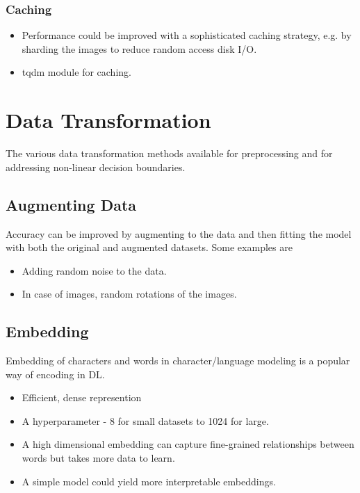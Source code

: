 \documentclass[a4paper, 12pt]{report}
\begin{document}
\subsection{Caching}
\begin{itemize}
\item Performance could be improved with a sophisticated caching strategy, e.g. by sharding the images to reduce random access disk I/O. 
\item {\color{cyan} tqdm module} for caching.
\end{itemize}

\chapter{Data Transformation}
The various data transformation methods available for preprocessing and for addressing non-linear decision boundaries.


\section{Augmenting Data}
\label{sec:augmentdata}
Accuracy can be improved by augmenting to the data and then fitting the model with both the original and augmented datasets. Some examples are

\begin{itemize}
\item Adding random noise to the data.
\item In case of images, random rotations of the images.
\end{itemize}


\section{Embedding}
Embedding of characters and words in character/language modeling is a popular way of encoding in DL.
\begin{itemize}
\item Efficient, dense represention
\item A hyperparameter - 8 for small datasets to 1024 for large.
\item A high dimensional embedding can capture fine-grained relationships between words but takes more data to learn.
\item A simple model could yield more interpretable embeddings.
\end{itemize}
\end{document}
